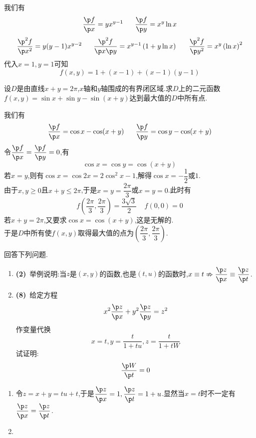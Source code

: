\documentclass{ctexart}
\begin{document}
\begin{solution}
    我们有
    \[\dfrac{\p f}{\p x}=yx^{y-1}\ \ \ \ \ \dfrac{\p f}{\p y}=x^y\ln x\]
    \[\dfrac{\p^2 f}{\p x^2}=y(y-1)x^{y-2}\ \ \ \ \ \dfrac{\p^2 f}{\p x\p y}=x^{y-1}\left(1+y\ln x\right)\ \ \ \ \ \dfrac{\p^2 f}{\p y^2}=x^y\left(\ln x\right)^2\]
    代入$x=1,y=1$可知
    \[f(x,y)=1+(x-1)+(x-1)(y-1)\]
\end{solution}
\begin{problem}[6.(10\songti{分})]
    设$D$是由直线$x+y=2\pi$,$x$轴和$y$轴围成的有界闭区域.求$D$上的二元函数$f(x,y)=\sin x+\sin y-\sin(x+y)$达到最大值的$D$中所有点.
\end{problem}
\begin{solution}
    我们有\[\dfrac{\p f}{\p x}=\cos x-\cos(x+y)\ \ \ \ \ \dfrac{\p f}{\p y}=\cos y-\cos(x+y)\]
    令$\dfrac{\p f}{\p x}=\dfrac{\p f}{\p y}=0$,有\[\cos x=\cos y=\cos(x+y)\]
    若$x=y$,则有$\cos x=\cos 2x=2\cos^2x-1$,解得$\cos x=-\dfrac12$或$1$.\\
    由于$x,y\geqslant0$且$x+y\leqslant2\pi$,于是$x=y=\dfrac{2\pi}{3}$或$x=y=0$.此时有
    \[f\left(\dfrac{2\pi}{3},\dfrac{2\pi}{3}\right)=\dfrac{3\sqrt3}{2}\ \ \ \ \ f(0,0)=0\]
    若$x+y=2\pi$,又要求$\cos x=\cos(x+y)$,这是无解的.\\
    于是$D$中所有使$f(x,y)$取得最大值的点为$\left(\dfrac{2\pi}{3},\dfrac{2\pi}{3}\right)$.
\end{solution}
\begin{problem}[7.(10\songti{分})]
    回答下列问题.
    \begin{enumerate}[label=\tbf{(\arabic*)}]
        \item \textbf{(2)}\ 举例说明:当$z$是$(x,y)$的函数,也是$(t,u)$的函数时,$x\equiv t\nRightarrow \dfrac{\p z}{\p x}\equiv\dfrac{\p z}{\p t}$.
        \item \textbf{(8)}\ 给定方程\[x^2\dfrac{\p z}{\p x}+y^2\dfrac{\p z}{\p y}=z^2\]作变量代换\[x=t,y=\dfrac{t}{1+tu},z=\dfrac{t}{1+tW}\]试证明:\[\dfrac{\p W}{\p t}=0\]
    \end{enumerate}
\end{problem}
\begin{solution}
    \begin{enumerate}[label=\tbf{(\arabic*)}]
        \item 令$z=x+y=tu+t$,于是$\dfrac{\p z}{\p x}=1,\dfrac{\p z}{\p t}=1+u$.显然当$x=t$时不一定有$\dfrac{\p z}{\p x}=\dfrac{\p z}{\p t}$.
        \item 
    \end{enumerate}
\end{solution}
\end{document}

